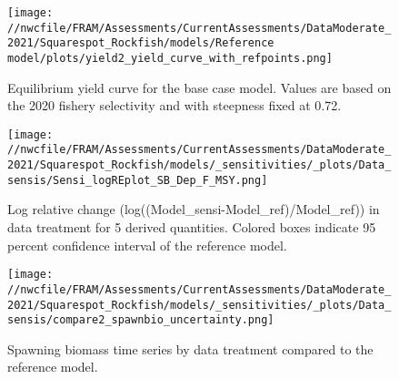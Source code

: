 \documentclass[11pt,
  english,
  a4paper,
]{article}
\begin{document}
\tagmcend\tagstructend


\begin{figure}
\centering
\texttt{[image: //nwcfile/FRAM/Assessments/CurrentAssessments/DataModerate\_2021/Squarespot\_Rockfish/models/Reference model/plots/yield2\_yield\_curve\_with\_refpoints.png]}
\caption{Equilibrium yield curve for the base case model. Values are based on the 2020 fishery selectivity and with steepness fixed at 0.72.\label{fig:yield}}
\end{figure}

\tagmcend\tagstructend


\begin{figure}
\centering
\texttt{[image: //nwcfile/FRAM/Assessments/CurrentAssessments/DataModerate\_2021/Squarespot\_Rockfish/models/\_sensitivities/\_plots/Data\_sensis/Sensi\_logREplot\_SB\_Dep\_F\_MSY.png]}
\caption{Log relative change (log((Model\_sensi-Model\_ref)/Model\_ref)) in data treatment for 5 derived quantities. Colored boxes indicate 95 percent confidence interval of the reference model.\label{fig:sensi-data-RE}}
\end{figure}

\tagmcend\tagstructend


\begin{figure}
\centering
\texttt{[image: //nwcfile/FRAM/Assessments/CurrentAssessments/DataModerate\_2021/Squarespot\_Rockfish/models/\_sensitivities/\_plots/Data\_sensis/compare2\_spawnbio\_uncertainty.png]}
\caption{Spawning biomass time series by data treatment compared to the reference model.\label{fig:sensi-data-ssb}}
\end{figure}

\tagmcend\tagstructend

\end{document}
